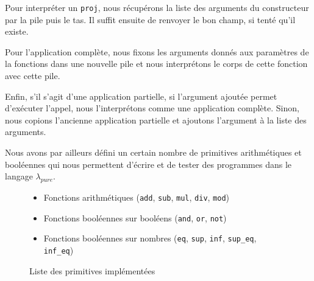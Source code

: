 \documentclass{rapportECL}
\begin{document}
Pour interpréter un \verb|proj|, nous récupérons la liste des arguments du constructeur par la pile puis le tas. Il suffit ensuite de renvoyer le bon champ, si tenté qu'il existe.


Pour l'application complète, nous fixons les arguments donnés aux paramètres de la fonctions dans une nouvelle pile et nous interprétons le corps de cette fonction avec cette pile.


Enfin, s'il s'agit d'une application partielle, si l'argument ajoutée permet d'exécuter l'appel, nous l'interprétons comme une application complète. Sinon, nous copions l'ancienne application partielle et ajoutons l'argument à la liste des arguments.

\bigskip

Nous avons par ailleurs défini un certain nombre de primitives arithmétiques et booléennes qui nous permettent d'écrire et 
de tester des programmes dans le langage $\lambda_{pure}$.

\begin{figure}[H]
	\begin{itemize}
		\item Fonctions arithmétiques (\verb|add|, \verb|sub|, \verb|mul|, \verb|div|, \verb|mod|)
		\item Fonctions booléennes sur booléens (\verb|and|, \verb|or|, \verb|not|)
		\item Fonctions booléennes sur nombres (\verb|eq|, \verb|sup|, \verb|inf|, \verb|sup_eq|, \verb|inf_eq|)
	\end{itemize}
	\label{primitives}
	\caption{Liste des primitives implémentées}
\end{figure}
\end{document}
